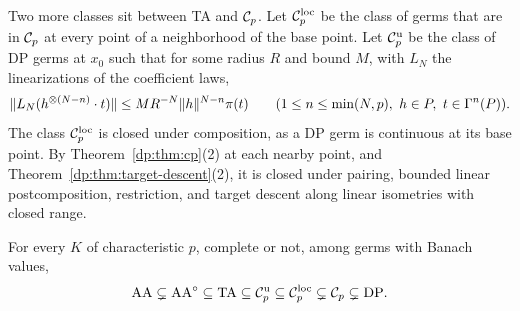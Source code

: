 Two more classes sit between TA and $\mathcal{C}_p$. Let $\mathcal{C}_p^{\rm loc}$ be the class of germs that are in $\mathcal{C}_p$ at every point of a neighborhood of the base point. Let $\mathcal{C}_p^{\rm u}$ be the class of DP germs at $x_0$ such that for some radius $R$ and bound $M$, with $L_N$ the linearizations of the coefficient laws,
\begin{equation}\label{dp:eq:cpu}
 \norm{L_N(h^{\otimes(N-n)}\cdot t)}\le MR^{-N}\norm h^{N-n}\pi(t)\qquad(1\le n\le\min(N,p),\ h\in P,\ t\in\Gamma^n(P)).
\end{equation}
The class $\mathcal{C}_p^{\rm loc}$ is closed under composition, as a DP germ is continuous at its base point. By Theorem~\ref{dp:thm:cp}(2) at each nearby point, and Theorem~\ref{dp:thm:target-descent}(2), it is closed under pairing, bounded linear postcomposition, restriction, and target descent along linear isometries with closed range.

\begin{theorem}\label{dp:thm:chain}
For every $K$ of characteristic $p$, complete or not, among germs with Banach values,
\[
 \mathrm{AA}\subsetneq\mathrm{AA}^\circ\subseteq\mathrm{TA}\subseteq\mathcal{C}_p^{\rm u}\subseteq\mathcal{C}_p^{\rm loc}\subsetneq\mathcal{C}_p\subsetneq\mathrm{DP}.
\]
\end{theorem}

